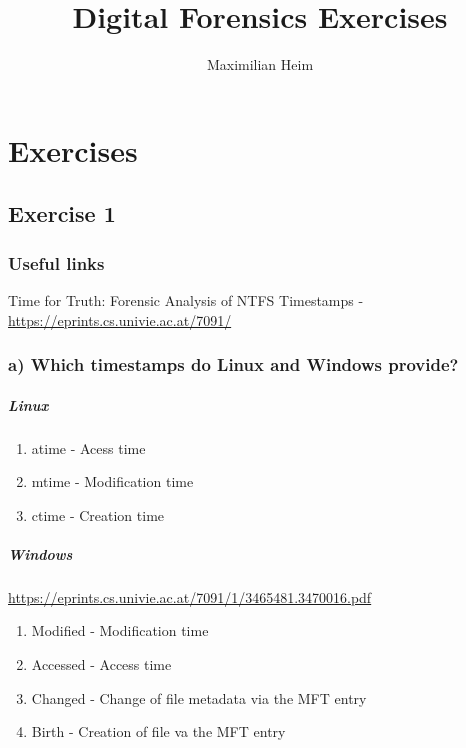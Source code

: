 \documentclass[10pt,a4paper]{report}
\author{Maximilian Heim}
\title{Digital Forensics Exercises}
\begin{document}
\chapter{Exercises}
\section{Exercise 1}
\subsection{Useful links}
Time for Truth: Forensic Analysis of NTFS Timestamps - \url{https://eprints.cs.univie.ac.at/7091/}
\subsection{a) Which timestamps do Linux and Windows provide?}
\paragraph{Linux}
\begin{enumerate}
    \item atime - Acess time
    \item mtime - Modification time
    \item ctime - Creation time
\end{enumerate}

\paragraph{Windows}
\url{https://eprints.cs.univie.ac.at/7091/1/3465481.3470016.pdf}
\begin{enumerate}
    \item Modified - Modification time
    \item Accessed - Access time
    \item Changed - Change of file metadata via the MFT entry
    \item Birth - Creation of file va the MFT entry
\end{enumerate}




\end{document}
